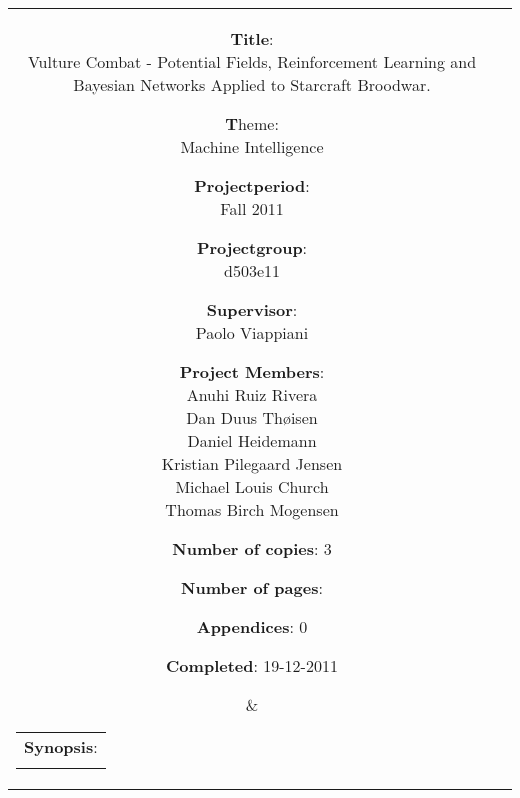 	\begin{tabular}{cc}
		\parbox[0.1cm]{7cm}{ %
			\begin{description}
				\item {\textbf{Title}:} \\
					Vulture Combat - Potential Fields, Reinforcement Learning and Bayesian Networks Applied to Starcraft Broodwar.
				\item {\textbf Theme:} \\
					Machine Intelligence
 			\end{description}

			\parbox{8cm}{ %
				\begin{description}
					\item {\textbf{Projectperiod}:}\\
					Fall 2011\\
					\hspace{4cm}
					\item {\textbf{Projectgroup}:}\\
					d503e11\\
					\hspace{4cm}
					\item {\textbf{Supervisor}:}\\
					Paolo Viappiani \\
					\item {\textbf{Project Members}:}\\ \newcommand{\sh}{18pt} %
					Anuhi Ruiz Rivera \\
					Dan Duus Thøisen \\
					Daniel Heidemann \\
					Kristian Pilegaard Jensen \\
					Michael Louis Church \\
					Thomas Birch Mogensen \\
				\end{description}
			}
			\begin{description}
				\item {\textbf{Number of copies}:} 3
				\item {\textbf{Number of pages}:} \pageref{LastPage}
				\item {\textbf{Appendices}:} 0
				\item {\textbf{Completed}:} 19-12-2011
			\end{description}
			\vfill 
		} &
		\parbox{7cm}{ %
			\hfill %
			\begin{tabular}{l}%
				{\textbf{Synopsis}:}\bigskip \\%
				\fbox{ %
					\parbox{6.5cm}{\bigskip %
					{\vfill{\small %
					 
						\bigskip}}%
					}}%
			\end{tabular}%
		}
	\end{tabular}
	\\ \\


